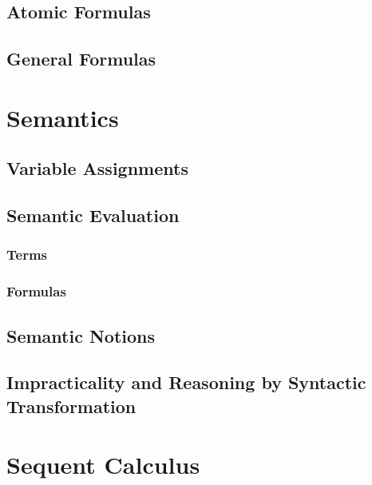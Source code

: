 \documentclass[a4paper, 11pt, accentcolor = tud3b]{tudreport}
\begin{document}
			\subsection{Atomic Formulas} %

			\subsection{General Formulas} %

		\section{Semantics} %

			\subsection{Variable Assignments} %

			\subsection{Semantic Evaluation} %

				\subsubsection{Terms} %

				\subsubsection{Formulas} %

			\subsection{Semantic Notions} %

			\subsection{Impracticality and Reasoning by Syntactic Transformation} %

		\section{Sequent Calculus} %
\end{document}
